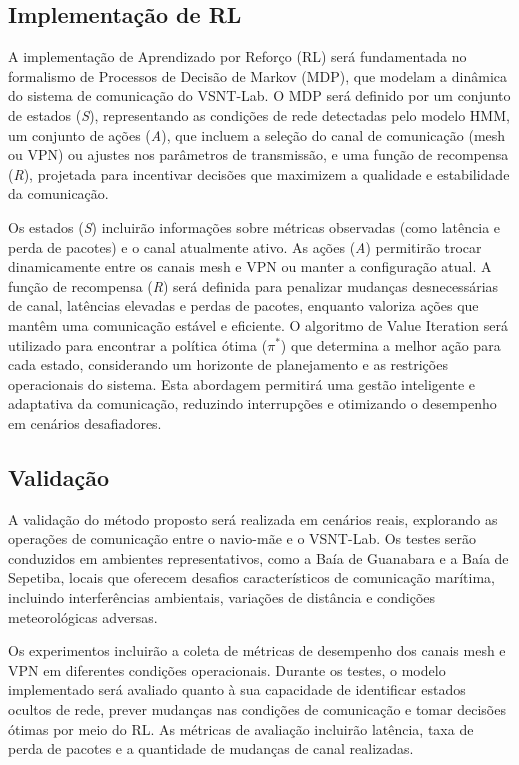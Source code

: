 \subsection{Implementação de RL}
A implementação de Aprendizado por Reforço (RL) será fundamentada no formalismo de Processos de Decisão de Markov (MDP), que modelam a dinâmica do sistema de comunicação do VSNT-Lab. O MDP será definido por um conjunto de estados (\textit{S}), representando as condições de rede detectadas pelo modelo HMM, um conjunto de ações (\textit{A}), que incluem a seleção do canal de comunicação (mesh ou VPN) ou ajustes nos parâmetros de transmissão, e uma função de recompensa (\textit{R}), projetada para incentivar decisões que maximizem a qualidade e estabilidade da comunicação.

Os estados (\textit{S}) incluirão informações sobre métricas observadas (como latência e perda de pacotes) e o canal atualmente ativo. As ações (\textit{A}) permitirão trocar dinamicamente entre os canais mesh e VPN ou manter a configuração atual. A função de recompensa (\textit{R}) será definida para penalizar mudanças desnecessárias de canal, latências elevadas e perdas de pacotes, enquanto valoriza ações que mantêm uma comunicação estável e eficiente. O algoritmo de Value Iteration será utilizado para encontrar a política ótima (\(\pi^*\)) que determina a melhor ação para cada estado, considerando um horizonte de planejamento e as restrições operacionais do sistema. Esta abordagem permitirá uma gestão inteligente e adaptativa da comunicação, reduzindo interrupções e otimizando o desempenho em cenários desafiadores.

\subsection{Validação}
A validação do método proposto será realizada em cenários reais, explorando as operações de comunicação entre o navio-mãe e o VSNT-Lab. Os testes serão conduzidos em ambientes representativos, como a Baía de Guanabara e a Baía de Sepetiba, locais que oferecem desafios característicos de comunicação marítima, incluindo interferências ambientais, variações de distância e condições meteorológicas adversas.

Os experimentos incluirão a coleta de métricas de desempenho dos canais mesh e VPN em diferentes condições operacionais. Durante os testes, o modelo implementado será avaliado quanto à sua capacidade de identificar estados ocultos de rede, prever mudanças nas condições de comunicação e tomar decisões ótimas por meio do RL. As métricas de avaliação incluirão latência, taxa de perda de pacotes e a quantidade de mudanças de canal realizadas.

